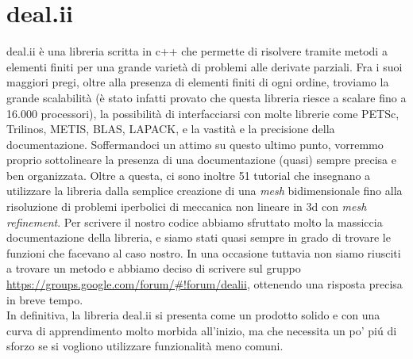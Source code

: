 \documentclass[a4paper,10pt]{report}
\theoremstyle{plain}
\theoremstyle{definition}
\theoremstyle{remark}
\begin{document}
\section{\textsf{deal.ii}}
\textsf{deal.ii} \`e una libreria scritta in c++ che permette di risolvere tramite metodi a elementi finiti per una grande variet\`a di problemi alle derivate parziali. Fra i suoi maggiori pregi, oltre alla presenza di elementi finiti di ogni ordine, troviamo la grande scalabilit\`a (\`e stato infatti provato che questa libreria riesce a scalare fino a 16.000 processori), la possibilit\`a di interfacciarsi con molte librerie come \textsf{PETSc}, \textsf{Trilinos}, \textsf{METIS}, \textsf{BLAS}, \textsf{LAPACK}, e la vastit\`a e la precisione della documentazione. Soffermandoci un attimo su questo ultimo punto, vorremmo proprio sottolineare la presenza di una documentazione (quasi) sempre precisa e ben organizzata. Oltre a questa, ci sono inoltre 51 tutorial che insegnano a utilizzare la libreria dalla semplice creazione di una \emph{mesh} bidimensionale fino alla risoluzione di problemi iperbolici di meccanica non lineare in 3d con \emph{mesh refinement}. Per scrivere il nostro codice abbiamo sfruttato molto la massiccia documentazione della libreria, e siamo stati quasi sempre in grado di trovare le funzioni che facevano al caso nostro. In una occasione tuttavia non siamo riusciti a trovare un metodo e abbiamo deciso di scrivere sul gruppo \url{https://groups.google.com/forum/#!forum/dealii}, ottenendo una risposta precisa in breve tempo.\\%
In definitiva, la libreria \textsf{deal.ii} si presenta come un prodotto solido e con una curva di apprendimento molto morbida all'inizio, ma che necessita un po' pi\'u di sforzo se si vogliono utilizzare funzionalit\`a meno comuni.
\end{document}
